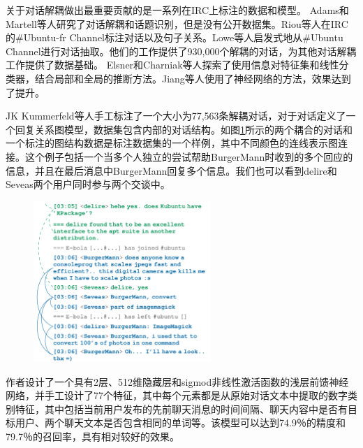 关于对话解耦做出最重要贡献的是一系列在IRC上标注的数据和模型。
Adams和 Martell等人\cite{adams2008topic}研究了对话解耦和话题识别，但是没有公开数据集。Riou等人\cite{riou2015using}在IRC的\#Ubuntu-fr Channel标注对话以及句子关系。Lowe等人\cite{lasecki2013conversations}启发式地从\#Ubuntu Channel进行对话抽取。他们的工作提供了930,000个解耦的对话，为其他对话解耦工作提供了数据基础。
Elsner和Charniak等人\cite{elsner2008you}探索了使用信息对特征集和线性分类器，结合局部和全局的推断方法。Jiang等人\cite{jiang2018learning}使用了神经网络的方法，效果达到了提升。

JK Kummerfeld等人\cite{kummerfeld2018large}手工标注了一个大小为77,563条解耦对话，对于对话定义了一个回复关系图模型，数据集包含内部的对话结构。如图\ref{fig:example-conversation}所示的两个耦合的对话和一个标注的图结构数据是标注数据集的一个样例，其中不同颜色的连线表示图连接。这个例子包括一个当多个人独立的尝试帮助BurgerMann时收到的多个回应的信息，并且在最后消息中BurgerMann回复多个信息。我们也可以看到delire和Seveas两个用户同时参与两个交谈中。
\begin{figure}[htbp]
    \centering
    \includegraphics[width=0.6\textwidth]{Img/example-conversation.png}
    \label{fig:example-conversation}
\end{figure}
作者设计了一个具有2层、512维隐藏层和sigmod非线性激活函数的浅层前馈神经网络，并手工设计了77个特征，其中每个元素都是从原始对话文本中提取的数字类别特征，其中包括当前用户发布的先前聊天消息的时间间隔、聊天内容中是否有目标用户、两个聊天文本是否包含相同的单词等。该模型可以达到74.9％的精度和79.7％的召回率，具有相对较好的效果。

